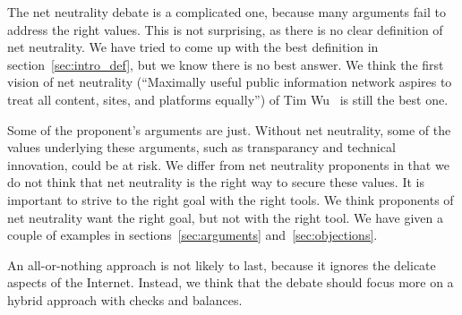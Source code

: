 The net neutrality debate is a complicated one, because many arguments fail to address the right values. This is not surprising, as there is no clear definition of net neutrality. We have tried to come up with the best definition in section~\ref{sec:intro_def}, but we know there is no best answer. We think the first vision of net neutrality (``Maximally useful public information network aspires to treat all content, sites, and platforms equally'') of Tim Wu~\cite{wu2003network} is still the best one.

Some of the proponent's arguments are just. Without net neutrality, some of the values underlying these arguments, such as transparancy and technical innovation, could be at risk. We differ from net neutrality proponents in that we do not think that net neutrality is the right way to secure these values. It is important to strive to the right goal with the right tools. We think proponents of net neutrality want the right goal, but not with the right tool. We have given a couple of examples in sections~\ref{sec:arguments} and~\ref{sec:objections}.

An all-or-nothing approach is not likely to last, because it ignores the delicate aspects of the Internet. Instead, we think that the debate should focus more on a hybrid approach with checks and balances.